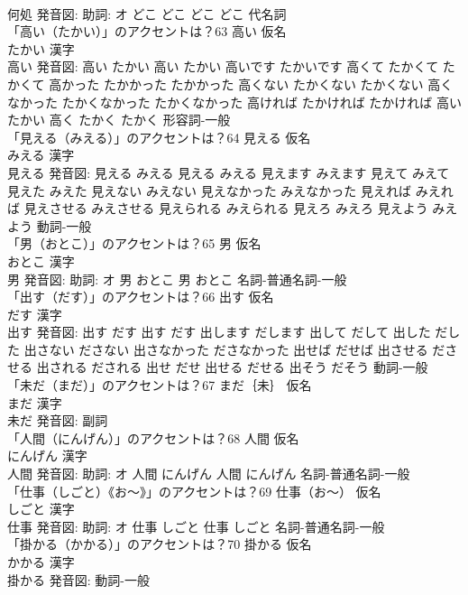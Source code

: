 \documentclass[8pt]{extreport}
\begin{document}
\begin{CJK}{UTF8}{min}
\\	何処 発音図: 助詞: オ	どこ どこ		どこ どこ				代名詞 
\\	「高い（たかい）」のアクセントは？63	高い 仮名　
\\	たかい 漢字　
\\	高い 発音図:	高い たかい		高い たかい 高いです たかいです 高くて たかくて たかくて 高かった たかかった たかかった 高くない たかくない たかくない 高くなかった たかくなかった たかくなかった 高ければ たかければ たかければ 高い たかい 高く たかく たかく				形容詞-一般 
\\	「見える（みえる）」のアクセントは？64	見える 仮名　
\\	みえる 漢字　
\\	見える 発音図:	見える みえる		見える みえる 見えます みえます 見えて みえて 見えた みえた 見えない みえない 見えなかった みえなかった 見えれば みえれば 見えさせる みえさせる 見えられる みえられる 見えろ みえろ 見えよう みえよう				動詞-一般 
\\	「男（おとこ）」のアクセントは？65	男 仮名　
\\	おとこ 漢字　
\\	男 発音図: 助詞: オ	男 おとこ		男 おとこ				名詞-普通名詞-一般 
\\	「出す（だす）」のアクセントは？66	出す 仮名　
\\	だす 漢字　
\\	出す 発音図:	出す だす		出す だす 出します だします 出して だして 出した だした 出さない ださない 出さなかった ださなかった 出せば だせば 出させる ださせる 出される だされる 出せ だせ 出せる だせる 出そう だそう				動詞-一般 
\\	「未だ（まだ）」のアクセントは？67	まだ｛未｝ 仮名　
\\	まだ 漢字　
\\	未だ 発音図:							副詞 
\\	「人間（にんげん）」のアクセントは？68	人間 仮名　
\\	にんげん 漢字　
\\	人間 発音図: 助詞: オ	人間 にんげん		人間 にんげん				名詞-普通名詞-一般 
\\	「仕事（しごと）《お〜》」のアクセントは？69	仕事（お〜） 仮名　
\\	しごと 漢字　
\\	仕事 発音図: 助詞: オ	仕事 しごと		仕事 しごと				名詞-普通名詞-一般 
\\	「掛かる（かかる）」のアクセントは？70	掛かる 仮名　
\\	かかる 漢字　
\\	掛かる 発音図:							動詞-一般 

\end{CJK}
\end{document}
